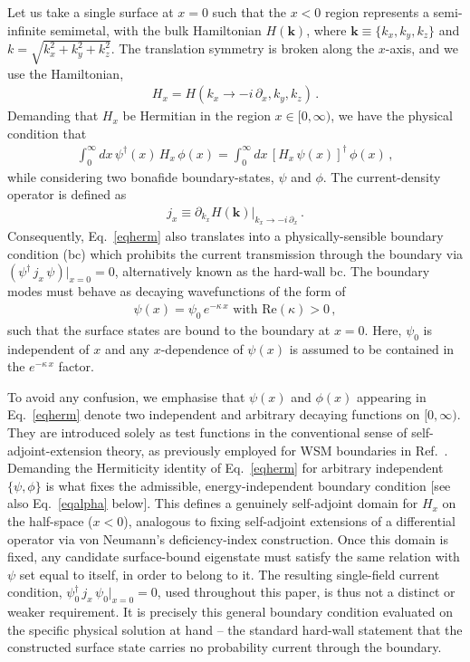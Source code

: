 \documentclass[aps,prb,onecolumn, footinbib, 10pt]{revtex4-2}
\begin{document}
Let us take a single surface at $x=0$ such that the $x<0$ region represents a semi-infinite semimetal, with the bulk Hamiltonian $H(\boldsymbol k)$, where $\boldsymbol k \equiv \lbrace k_x, k_y, k_z \rbrace $ and $k =\sqrt{k_x^2 + k_y^2 + k_z^2}$. The translation symmetry is broken along the $x$-axis, and we use the Hamiltonian,
\begin{align}
H_x = H (k_x \rightarrow -i \, \partial_x , k_y, k_z)\,.
\end{align}
Demanding that $H_x $ be Hermitian in the region $x \in [0, \infty)$, we have the physical condition that
\begin{align}
\label{eqherm}
 \int_0^\infty  dx \,\psi^\dagger (x) \, H_x\,\phi (x) = 
 \int_0^\infty  dx\, [H_x\, \psi(x) ]^\dagger\,\phi(x) \,,
\end{align}
while considering two bonafide boundary-states, $\psi $ and $\phi$. The current-density operator is defined as
\begin{align}
j_x \equiv \partial_{k_x}  H(\boldsymbol k) \vert_{k_x \rightarrow -i\, \partial_x}\,.
\end{align}
Consequently, Eq.~\eqref{eqherm} also translates into a physically-sensible boundary condition (bc) which prohibits the current transmission through the boundary via $ (\psi^\dagger \, j_x \, \psi )\vert_{x=0}= 0$, alternatively known as the hard-wall bc. The boundary modes must behave as decaying wavefunctions of the form of
\begin{align}
\psi (x) = \psi_0 \, e^{- \kappa \, x} \text{ with } \text{Re}(\kappa) > 0\,,
\end{align}
such that the surface states are bound to the boundary at $ x= 0 $. Here, $\psi_0$ is independent of $x$ and any $x$-dependence of $\psi(x)$ is assumed to be contained in the $ e^{- \kappa \, x}$ factor. 

To avoid any confusion, we emphasise that $\psi(x)$ and $\phi(x)$ appearing in Eq.~\eqref{eqherm} denote two independent and arbitrary decaying functions on $[0,\infty)$. They are introduced solely as test functions in the conventional sense of self-adjoint-extension theory, as previously employed for WSM boundaries in Ref.~\cite{babak-arc-weyl}. Demanding the Hermiticity identity of Eq.~\eqref{eqherm} for arbitrary independent $\lbrace \psi,\phi \rbrace $ is what fixes the admissible, energy-independent boundary condition [see also Eq.~\eqref{eqalpha} below]. This defines a genuinely self-adjoint domain for $H_x$ on the half-space ($x<0$), analogous to fixing self-adjoint extensions of a differential operator via von Neumann's deficiency-index construction. Once this domain is fixed, any candidate surface-bound eigenstate must satisfy the same relation with $\psi$ set equal to itself, in order to belong to it. The resulting single-field current condition, $\psi_0^\dagger\, j_x\, \psi_0|_{x=0}=0$, used throughout this paper, is thus not a distinct or weaker requirement. It is precisely this general boundary condition evaluated on the specific physical solution at hand -- the standard hard-wall statement that the constructed surface state carries no probability current through the boundary.
\end{document}
